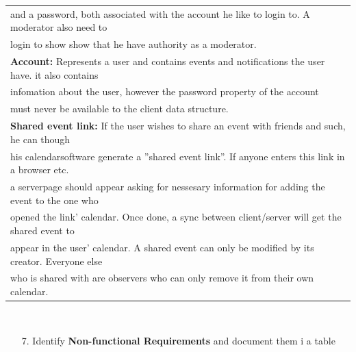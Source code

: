 \documentclass[a4paper]{article}
\begin{document}
\begin{tabular}{l}
    and a password, both associated with the account he like to login to. A moderator also need to\\
    login to show show that he have authority as a moderator.\\
	\hline
    \textbf{Account:} 
    Represents a user and contains events and notifications the user have. it also contains\\
    infomation about the user, however the password property of the account\\ must never be available to the client data structure.\\
	\hline
    \textbf{Shared event link:} 
    If the user wishes to share an event with friends and such, he can though\\
    his calendarsoftware generate a ''shared event link''. If anyone enters this link in a browser etc.\\
    a serverpage should appear asking for nessesary information for adding the event to the one who\\
    opened the link' calendar. Once done, a sync between client/server will get the shared event to\\
    appear in the user' calendar. A shared event can only be modified by its creator. Everyone else\\
    who is shared with are observers who can only remove it from their own calendar. \\
	\hline
\end{tabular}
	\\
\pagebreak


\begin{enumerate}
		\item[7.] Identify \textbf{Non-functional Requirements} and document them i a table\\
\end{enumerate}
\end{document}
